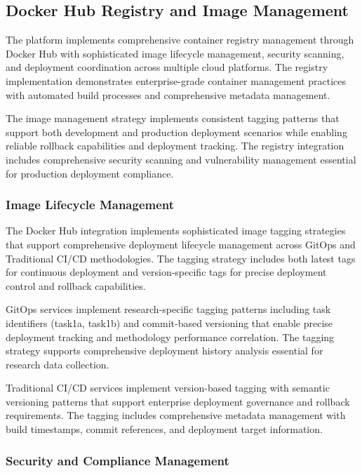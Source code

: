 \subsection{Docker Hub Registry and Image Management}

The platform implements comprehensive container registry management through Docker Hub with sophisticated image lifecycle management, security scanning, and deployment coordination across multiple cloud platforms. The registry implementation demonstrates enterprise-grade container management practices with automated build processes and comprehensive metadata management.

The image management strategy implements consistent tagging patterns that support both development and production deployment scenarios while enabling reliable rollback capabilities and deployment tracking. The registry integration includes comprehensive security scanning and vulnerability management essential for production deployment compliance.

\subsubsection{Image Lifecycle Management}

The Docker Hub integration implements sophisticated image tagging strategies that support comprehensive deployment lifecycle management across GitOps and Traditional CI/CD methodologies. The tagging strategy includes both latest tags for continuous deployment and version-specific tags for precise deployment control and rollback capabilities.

GitOps services implement research-specific tagging patterns including task identifiers (task1a, task1b) and commit-based versioning that enable precise deployment tracking and methodology performance correlation. The tagging strategy supports comprehensive deployment history analysis essential for research data collection.

Traditional CI/CD services implement version-based tagging with semantic versioning patterns that support enterprise deployment governance and rollback requirements. The tagging includes comprehensive metadata management with build timestamps, commit references, and deployment target information.

\subsubsection{Security and Compliance Management}

